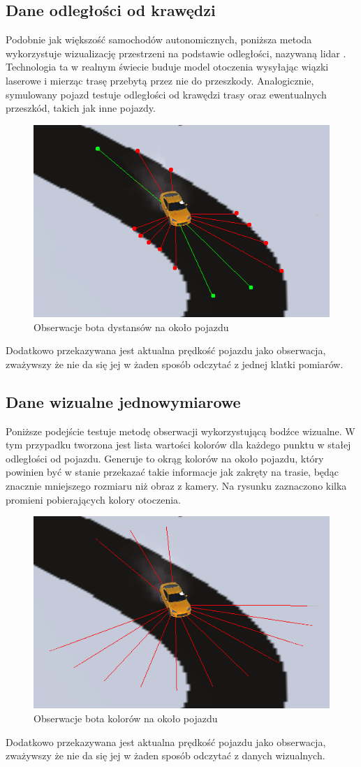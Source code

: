 \subsection{Dane odległości od krawędzi}
Podobnie jak większość samochodów autonomicznych, poniższa metoda wykorzystuje wizualizację przestrzeni na podstawie odległości, nazywaną lidar \cite{Lidar}. Technologia ta w realnym świecie buduje model otoczenia wysyłając wiązki laserowe i mierząc trasę przebytą przez nie do przeszkody. Analogicznie, symulowany pojazd testuje odległości od krawędzi trasy oraz ewentualnych przeszkód, takich jak inne pojazdy.
\begin{figure}[H]
    \centering
    \includegraphics[width=.5\textwidth]{figures/observations_0}
    \caption{Obserwacje bota dystansów na około pojazdu}
    \label{fig}
\end{figure}
Dodatkowo przekazywana jest aktualna prędkość pojazdu jako obserwacja, zważywszy że nie da się jej w żaden sposób odczytać z jednej klatki pomiarów.

\subsection{Dane wizualne jednowymiarowe}
Poniższe podejście testuje metodę obserwacji wykorzystującą bodźce wizualne. W tym przypadku tworzona jest lista wartości kolorów dla każdego punktu w stałej odległości od pojazdu. Generuje to okrąg kolorów na około pojazdu, który powinien być w stanie przekazać takie informacje jak zakręty na trasie, będąc znacznie mniejszego rozmiaru niż obraz z kamery. Na rysunku zaznaczono kilka promieni pobierających kolory otoczenia.
\begin{figure}[H]
    \centering
    \includegraphics[width=.5\textwidth]{figures/observations_1}
    \caption{Obserwacje bota kolorów na około pojazdu}
    \label{fig}
\end{figure}
Dodatkowo przekazywana jest aktualna prędkość pojazdu jako obserwacja, zważywszy że nie da się jej w żaden sposób odczytać z danych wizualnych.

